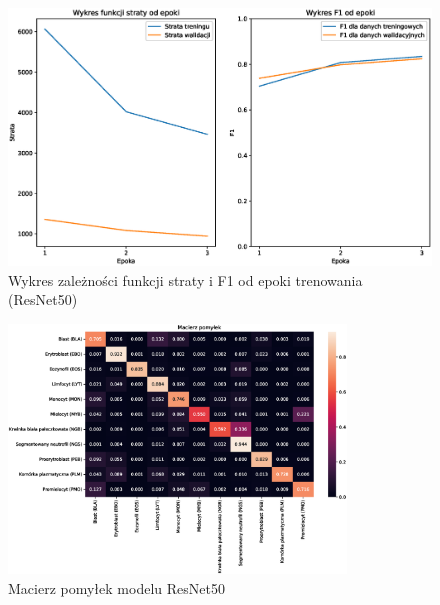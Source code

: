 \begin{figure}
    \centering
    \includegraphics[width=\textwidth]{experiments/resnet50/combined}
    \caption{Wykres zależności funkcji straty i F1 od epoki trenowania (ResNet50)}
    \label{fig:plot_resnet50}
\end{figure}
\begin{figure}
    \centering
    \includegraphics[width=0.8\textwidth]{experiments/resnet50/confusion_matrix}
    \caption{Macierz pomyłek modelu ResNet50}
    \label{fig:confusion_resnet50}
\end{figure}

